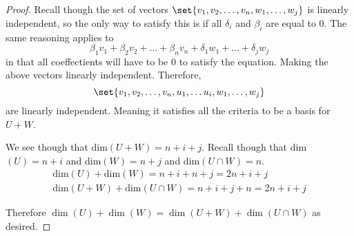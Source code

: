 \documentclass[12pt]{article}
\DeclarePairedDelimiter\set\{\}
\begin{document}
\begin{proof}
    Recall though the set of vectors $\set{v_1,v_2,\dots, v_n, w_1,\dots, w_j}$ is linearly independent, so the only way to satisfy this is if all $\delta_i$ and $\beta_i$ are equal to 0. The same reasoning applies to 
    \[\beta_1v_1+\beta_2v_2+\dots+ \beta_nv_n+ \delta_1w_1+\dots+\delta_j w_j\]
    in that all coeffectients will have to be 0 to satisfy the equation. Making the above vectors linearly independent. Therefore,
    \[\set{v_1, v_2, \dots, v_n, u_1, \dots u_i,w_1,\dots, w_j}\] are linearly independent. Meaning it satisfies all the criteria to be a basis for $U+W$. 

    We see though that dim$(U+W) = n + i + j$. Recall though that dim$(U) = n + i$ and dim$(W) = n + j$ and dim$(U\cap W) = n$. 
    \begin{align*}
        \text{dim}(U) + \text{dim}(W) = n+i +n+j = 2n + i + j \\
        \text{dim}(U+ W) + \text{dim}(U\cap W ) = n+i + j + n = 2n + i + j 
    \end{align*}

    Therefore $\dim(U) + \dim(W) = \dim(U + W) + \dim(U \cap W)$ as desired.
\end{proof}
\end{document}
